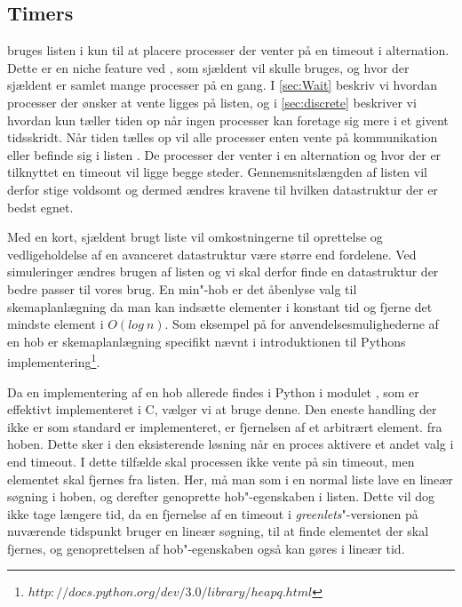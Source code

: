 \subsection{Timers}  
 bruges listen  i \pycsp kun til at placere processer der venter på en timeout i alternation. Dette er en niche feature ved \pycsp, som  sjældent vil skulle bruges, og hvor der sjældent er samlet mange processer på en gang. 
 I \cref{sec:Wait} beskriv vi hvordan processer der ønsker at vente ligges på  listen, og i \cref{sec:discrete} beskriver vi hvordan \sched kun tæller tiden op når ingen processer kan foretage sig mere i et givent tidsskridt. Når tiden tælles op vil  alle processer enten vente på kommunikation eller befinde sig i listen . De processer der venter i en alternation og hvor der er tilknyttet en timeout vil ligge begge steder. Gennemsnitslængden af listen vil derfor stige voldsomt og dermed ændres kravene til hvilken  datastruktur der er bedst egnet. 
 
Med en kort, sjældent brugt liste vil omkostningerne til oprettelse og vedligeholdelse af en avanceret datastruktur være større end fordelene. Ved simuleringer ændres brugen af listen og vi skal derfor finde en datastruktur der bedre passer til vores brug. En min"-hob er det åbenlyse valg til skemaplanlægning da  man kan  indsætte elementer i konstant tid og fjerne det mindste element i $O(log\ n)$. Som eksempel på for anvendelsesmulighederne af en hob er skemaplanlægning specifikt nævnt i introduktionen til Pythons implementering\footnote{$http://docs.python.org/dev/3.0/library/heapq.html$}.  

Da en implementering af en hob allerede findes i Python i modulet , som er effektivt implementeret i C, vælger vi at bruge denne. Den eneste handling
der ikke er som standard er implementeret, er fjernelsen af et arbitrært element.
fra hoben. Dette sker i den eksisterende løsning når en proces
aktivere et andet valg i  end timeout. I dette tilfælde skal
processen ikke vente på sin timeout, men elementet skal fjernes fra
 listen. Her, må man som i
en normal liste lave en lineær søgning i hoben, og derefter genoprette
hob"-egenskaben i listen. Dette vil dog ikke tage længere tid, da en fjernelse af en timeout i \emph{greenlets}"-versionen på nuværende
tidspunkt bruger en lineær søgning, til at finde elementet der skal
fjernes, og genoprettelsen af hob"-egenskaben også kan gøres i lineær tid.


